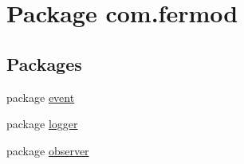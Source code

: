 \hypertarget{a00016}{}\section{Package com.\+fermod}
\label{a00016}
\subsection*{Packages}
\begin{DoxyCompactItemize}
\item 
package \mbox{\hyperlink{a00014}{event}}
\item 
package \mbox{\hyperlink{a00017}{logger}}
\item 
package \mbox{\hyperlink{a00018}{observer}}
\end{DoxyCompactItemize}

